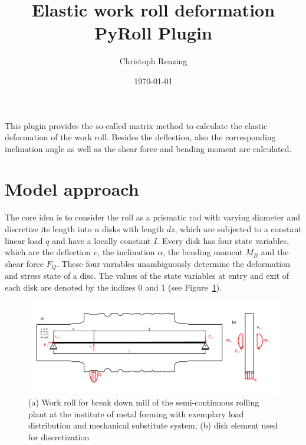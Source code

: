 \documentclass[11pt]{PyRollDocs}
\begin{document}
    \title{Elastic work roll deformation PyRoll Plugin}
    \author{Christoph Renzing}
    \date{\today}

    \maketitle

    This plugin provides the so-called matrix method to calculate the elastic deformation of the work roll.
    Besides the deflection, also the corresponding inclination angle as well as the shear force and bending moment are calculated.


    \section{Model approach}\label{sec:model-approach}

    The core idea is to consider the roll as a prismatic rod with varying diameter and discretize
    its length into $n$ disks with length $dz$, which are subjected to a constant linear load $q$ and have a locally constant $I$.
    Every disk has four state variables, which are the deflection $v$,
    the inclination $\alpha$, the bending moment $M_B$ and the shear force $F_Q$.
    These four variables unambiguously determine the deformation and stress state of a disc.
    The values of the state variables at entry and exit of each disk are denoted by the indizes $0$ and $1$ (see Figure~\ref{fig:exemplary-roll-and-disk}).

    \begin{figure}
        \centering
        \includegraphics[width=\linewidth]{img/exemplary-roll}
        \caption{(a) Work roll for break down mill of the semi-continuous rolling plant at the institute of metal forming with exemplary load distribution and mechanical substitute system; (b) disk element used for discretization}
        \label{fig:exemplary-roll-and-disk}
    \end{figure}
\end{document}
